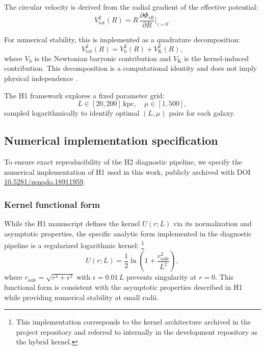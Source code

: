 \documentclass[twocolumn,linenumbers]{aastex701}
\begin{document}
The circular velocity is derived from the radial gradient of the effective
potential:
\begin{equation}
	V^2_{\mathrm{tot}}(R) = R\, \frac{\partial \Phi_{\mathrm{eff}}}
	{\partial R}\Bigg|_{z=0}.
	\label{eq:v_gradient}
\end{equation}

For numerical stability, this is implemented as a quadrature decomposition:
\begin{equation}
	V^2_{\mathrm{tot}}(R) = V^2_{\mathrm{b}}(R) + V^2_{\mathrm{K}}(R),
	\label{eq:v_quadrature}
\end{equation}
where $V_{\mathrm{b}}$ is the Newtonian baryonic contribution and
$V_{\mathrm{K}}$ is the kernel-induced contribution. This decomposition is a
computational identity and does not imply physical independence
\citep{figueiredo2024_h1}.

The H1 framework explores a fixed parameter grid:
\begin{equation}
	L \in [20, 200]\,\mathrm{kpc}, \quad \mu \in [1, 500],
	\label{eq:param_grid}
\end{equation}
sampled logarithmically to identify optimal $(L, \mu)$ pairs for each galaxy.

\subsection{Numerical implementation specification}

To ensure exact reproducibility of the H2 diagnostic pipeline, we specify
the numerical implementation of H1 used in this work, publicly archived
with DOI
\href{https://doi.org/10.5281/zenodo.18911959}{10.5281/zenodo.18911959}.

\subsubsection{Kernel functional form}

While the H1 manuscript defines the kernel $U(r;L)$ via its normalization
and asymptotic properties, the specific analytic form implemented in the
diagnostic pipeline is a regularized logarithmic kernel:
\footnote{This implementation corresponds to the kernel architecture archived
in the project repository and referred to internally in the development
repository as the hybrid kernel.}
\begin{equation}
	U(r; L) = \frac{1}{2} \ln\left(1 + \frac{r^2_{\mathrm{safe}}}{L^2}\right),
	\label{eq:kernel_implementation}
\end{equation}
where $r_{\mathrm{safe}} = \sqrt{r^2 + \epsilon^2}$ with $\epsilon = 0.01\,L$
prevents singularity at $r = 0$. This functional form is consistent with the
asymptotic properties described in H1 while providing numerical stability at
small radii.
\end{document}
